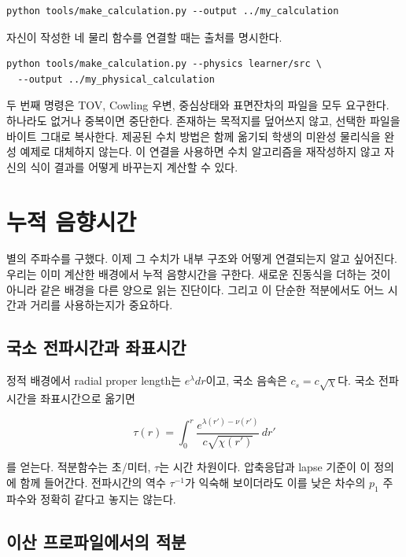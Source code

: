 \documentclass[
  10pt,
  a4paper,
]{article}
\begin{document}
\begin{verbatim}
python tools/make_calculation.py --output ../my_calculation
\end{verbatim}

자신이 작성한 네 물리 함수를 연결할 때는 출처를 명시한다.

\begin{verbatim}
python tools/make_calculation.py --physics learner/src \
  --output ../my_physical_calculation
\end{verbatim}

두 번째 명령은 TOV, Cowling 우변, 중심상태와 표면잔차의 파일을 모두
요구한다. 하나라도 없거나 중복이면 중단한다. 존재하는 목적지를 덮어쓰지
않고, 선택한 파일을 바이트 그대로 복사한다. 제공된 수치 방법은 함께
옮기되 학생의 미완성 물리식을 완성 예제로 대체하지 않는다. 이 연결을
사용하면 수치 알고리즘을 재작성하지 않고 자신의 식이 결과를 어떻게
바꾸는지 계산할 수 있다.


\section{누적 음향시간}\label{uxb204uxc801-uxc74cuxd5a5uxc2dcuxac04}

별의 주파수를 구했다. 이제 그 수치가 내부 구조와 어떻게 연결되는지 알고
싶어진다. 우리는 이미 계산한 배경에서 누적 음향시간을 구한다. 새로운
진동식을 더하는 것이 아니라 같은 배경을 다른 양으로 읽는 진단이다.
그리고 이 단순한 적분에서도 어느 시간과 거리를 사용하는지가 중요하다.

\subsection{국소 전파시간과
좌표시간}\label{uxad6duxc18c-uxc804uxd30cuxc2dcuxac04uxacfc-uxc88cuxd45cuxc2dcuxac04}

정적 배경에서 radial proper length는 \(e^\lambda dr\)이고, 국소 음속은
\(c_s=c\sqrt\chi\)다. 국소 전파시간을 좌표시간으로 옮기면

\[
\tau(r)=\int_0^r\frac{e^{\lambda(r')-\nu(r')}}{c\sqrt{\chi(r')}}\,dr'
\]

를 얻는다. 적분함수는 초/미터, \(\tau\)는 시간 차원이다. 압축응답과
lapse 기준이 이 정의에 함께 들어간다. 전파시간의 역수 \(\tau^{-1}\)가
익숙해 보이더라도 이를 낮은 차수의 \(p_1\) 주파수와 정확히 같다고 놓지는
않는다.

\subsection{이산 프로파일에서의
적분}\label{uxc774uxc0b0-uxd504uxb85cuxd30cuxc77cuxc5d0uxc11cuxc758-uxc801uxbd84}
\end{document}
